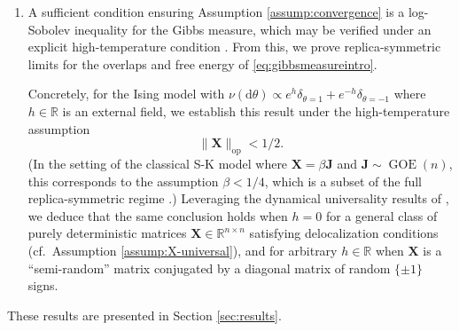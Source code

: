 \documentclass[11pt,letterpaper,reqno]{amsart}
\def\R{\mathbb{R}}
\def\d{\mathrm{d}}
\def\X{\mathbf{X}}
\def\J{\mathbf{J}}
\def\GOE{\operatorname{GOE}}
\def\op{\mathrm{op}}
\theoremstyle{definition}
\numberwithin{equation}{section}
\begin{document}
\begin{enumerate}[1.]
In this dynamical regime, we prove that the preceding kernels $(C_g,R_g)$ have
time-translation-invariant limits $(c_g,r_g)$ as $t \to \infty$,
which satisfy a fluctuation-dissipation relation
\begin{equation}\label{eq:rgfdtintro}
r_g(t)={-}c_g'(t).
\end{equation}
In contrast to the mean-field limit of Sompolinsky-Zippelius in
\eqref{eq:sompolinskydmft}, the correlation kernel $c_g(\cdot)$ may not have a
mixture-of-exponentials form. We instead establish a sequence of approximations
$c_g(t) \approx u_m^\top e^{-tA_m}u_m$ with non-diagonal, asymmetric matrices
$A_m \in \R^{m \times m}$, leading to a sequence of Markovian
approximations of \eqref{eq:dmftintro},
\begin{equation}\label{eq:markovapproxintro}
\begin{aligned}
\d\theta^t&=[f(\theta^t)+u_m^\top x^t+z]\d t+\sqrt{2}\,\d b^t\\
\d x^t&={-}A_m[x^t-u_m\theta^t]\d t+\Sigma_m\,\d b_x^t.
\end{aligned}
\end{equation} 
Via these approximations, we show that
$\{\theta^t\}_{t \geq 0}$ in \eqref{eq:dmftintro} converges to an equilibrium
law that coincides with a replica-symmetric prediction for the empirical distribution of coordinates under the Gibbs measure
\eqref{eq:gibbsmeasureintro}.\\

\item A sufficient condition ensuring Assumption \ref{assump:convergence}
is a log-Sobolev inequality for the Gibbs measure, which
may be verified under an explicit high-temperature condition
\cite{bauerschmidt2019very}. From this, we prove replica-symmetric
limits for the overlaps and free energy of \eqref{eq:gibbsmeasureintro}.

Concretely, for the Ising model with $\nu(\d\theta) \propto e^h
\delta_{\theta=1}+e^{-h}\delta_{\theta=-1}$ where $h \in \R$ is an external field,
we establish this result under the high-temperature assumption  
\begin{equation}\label{eq:hightempintro}
\|\X\|_\op<1/2.
\end{equation}
(In the setting of the classical S-K model where $\X=\beta\J$ and $\J \sim \GOE(n)$, this corresponds to the assumption $\beta<1/4$, which is a subset of the full replica-symmetric regime \cite{lopatto2026replica}.)
Leveraging the dynamical universality results of
\cite{dudeja2023universality,wang2024universality}, we deduce
that the same conclusion holds when $h=0$ for a general class of
purely deterministic matrices $\X \in \R^{n \times n}$ satisfying delocalization
conditions (cf.\ Assumption \ref{assump:X-universal}), and for arbitrary $h \in
\R$ when $\X$ is a ``semi-random'' matrix conjugated by a diagonal matrix of
random $\{\pm 1\}$ signs.
\end{enumerate}
These results are presented in Section \ref{sec:results}.
\end{document}

